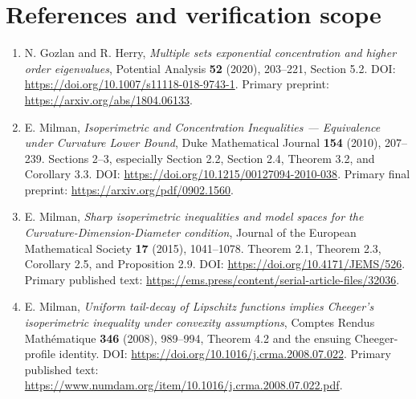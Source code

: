 \documentclass[11pt,a4paper]{article}
\providecommand{\tightlist}{\setlength{\itemsep}{0pt}\setlength{\parskip}{0pt}}
\begin{document}
\hypertarget{1013-references-and-verification-scope}{%
\section{References and verification
scope}\label{1013-references-and-verification-scope}}

\begin{enumerate}
\def\labelenumi{\arabic{enumi}.}
\tightlist
\item
  N. Gozlan and R. Herry, \emph{Multiple sets exponential concentration
  and higher order eigenvalues}, Potential Analysis \textbf{52} (2020),
  203--221, Section 5.2. DOI:
  \url{https://doi.org/10.1007/s11118-018-9743-1}. Primary preprint:
  \url{https://arxiv.org/abs/1804.06133}.
\item
  E. Milman, \emph{Isoperimetric and Concentration Inequalities ---
  Equivalence under Curvature Lower Bound}, Duke Mathematical Journal
  \textbf{154} (2010), 207--239. Sections 2--3, especially Section 2.2,
  Section 2.4, Theorem 3.2, and Corollary 3.3. DOI:
  \url{https://doi.org/10.1215/00127094-2010-038}. Primary final
  preprint: \url{https://arxiv.org/pdf/0902.1560}.
\item
  E. Milman, \emph{Sharp isoperimetric inequalities and model spaces for
  the Curvature-Dimension-Diameter condition}, Journal of the European
  Mathematical Society \textbf{17} (2015), 1041--1078. Theorem 2.1,
  Theorem 2.3, Corollary 2.5, and Proposition 2.9. DOI:
  \url{https://doi.org/10.4171/JEMS/526}. Primary published text:
  \url{https://ems.press/content/serial-article-files/32036}.
\item
  E. Milman, \emph{Uniform tail-decay of Lipschitz functions implies
  Cheeger's isoperimetric inequality under convexity assumptions},
  Comptes Rendus Mathématique \textbf{346} (2008), 989--994, Theorem 4.2
  and the ensuing Cheeger-profile identity. DOI:
  \url{https://doi.org/10.1016/j.crma.2008.07.022}. Primary published
  text:
  \url{https://www.numdam.org/item/10.1016/j.crma.2008.07.022.pdf}.
\end{enumerate}
\end{document}
